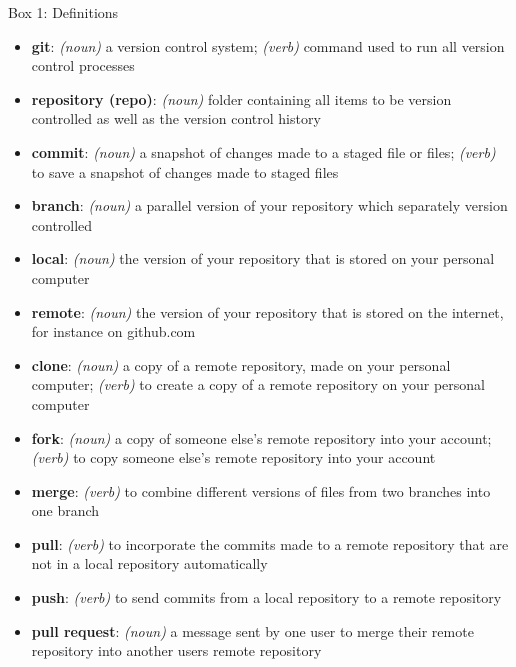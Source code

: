 Box 1: Definitions

\begin{itemize}
\item \textbf{git}: \textit{(noun)} a version control system; \textit{(verb)} command used to run all version control processes
\item \textbf{repository (repo)}: \textit{(noun)} folder containing all items to be version controlled as well as the version control history
\item \textbf{commit}: \textit{(noun)} a snapshot of changes made to a staged file or files; \textit{(verb)} to save a snapshot of changes made to staged files 
\item \textbf{branch}: \textit{(noun)} a parallel version of your repository which separately version controlled
\item \textbf{local}: \textit{(noun)} the version of your repository that is stored on your personal computer
\item \textbf{remote}: \textit{(noun)} the version of your repository that is stored on the internet, for instance on github.com
\item \textbf{clone}: \textit{(noun)} a copy of a remote repository, made on your personal computer; \textit{(verb)} to create a copy of a remote repository on your personal computer
\item \textbf{fork}: \textit{(noun)} a copy of someone else's remote repository into your account; \textit{(verb)} to copy someone else's remote repository into your account
\item \textbf{merge}: \textit{(verb)} to combine different versions of files from two branches into one branch
\item \textbf{pull}: \textit{(verb)} to incorporate the commits made to a remote repository that are not in a local repository automatically
\item \textbf{push}: \textit{(verb)} to send commits from a local repository to a remote repository
\item \textbf{pull request}: \textit{(noun)} a message sent by one user to merge their remote repository into another users remote repository
\end{itemize}